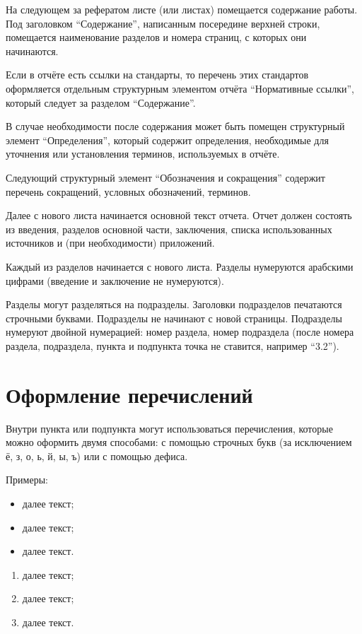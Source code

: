 \documentclass[utf8,14pt, coursreport]{G7-32}
\begin{document}
На следующем за рефератом листе (или листах) помещается содержание работы. Под заголовком ``Содержание'', написанным посередине верхней строки, помещается наименование разделов и номера страниц, с которых они начинаются.

Если в отчёте есть ссылки на стандарты, то перечень этих стандартов оформляется отдельным структурным элементом отчёта ``Нормативные ссылки'', который следует за разделом ``Содержание''.

В случае необходимости после содержания может быть помещен структурный элемент ``Определения'', который содержит определения, необходимые для уточнения или установления терминов, используемых в отчёте.

Следующий структурный элемент ``Обозначения и сокращения'' содержит перечень сокращений, условных обозначений, терминов.

Далее с нового листа начинается основной текст отчета. Отчет должен состоять из введения, разделов основной части, заключения, списка использованных источников и (при необходимости) приложений.

Каждый из разделов начинается с нового листа. Разделы нумеруются арабскими цифрами (введение и заключение не нумеруются).

Разделы могут разделяться на подразделы. Заголовки подразделов печатаются строчными буквами. Подразделы не начинают с новой страницы. Подразделы нумеруют двойной нумерацией: номер раздела, номер подраздела (после номера раздела, подраздела, пункта и подпункта точка не ставится, например ``3.2'').

\section{Оформление перечислений}

Внутри пункта или подпункта могут использоваться перечисления, которые можно оформить двумя способами: с помощью строчных букв (за исключением ё, з, о, ь, й, ы, ъ) или с помощью дефиса.

Примеры:
\begin{itemize}
\item далее текст;
\item далее текст;
\item далее текст.
\end{itemize}
\begin{enumerate}
\item далее текст;
\item далее текст;
\item далее текст.
\end{enumerate}
\end{document}
